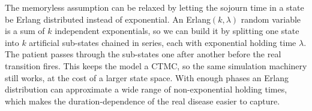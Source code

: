 The memoryless assumption can be relaxed by letting the sojourn time in a state
be Erlang distributed instead of exponential. An Erlang$(k, \lambda)$ random
variable is a sum of $k$ independent exponentials, so we can build it by
splitting one state into $k$ artificial sub-states chained in series, each with
exponential holding time $\lambda$. The patient passes through the sub-states
one after another before the real transition fires. This keeps the model a
CTMC, so the same simulation machinery still works, at the cost of a larger
state space. With enough phases an Erlang distribution can approximate a wide
range of non-exponential holding times, which makes the duration-dependence of
the real disease easier to capture.
